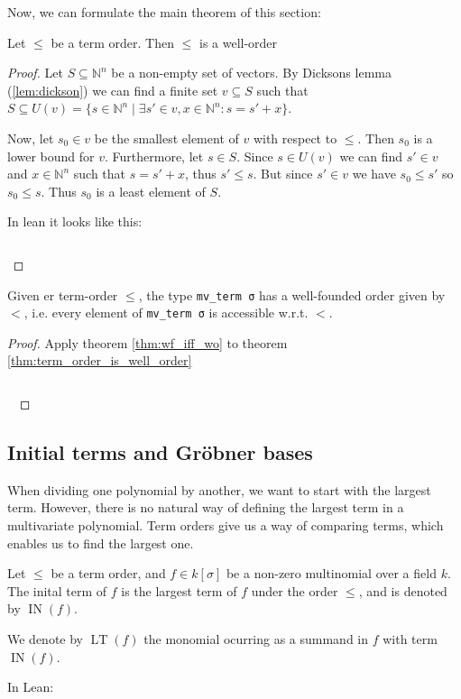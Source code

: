 \documentclass[a4paper, 12pt]{article}
\newcommand{\N}{\mathbb{N}}
\DeclareMathOperator{\IN}{IN}
\DeclareMathOperator{\LT}{LT}
\newcommand{\lean}[1]{\texttt{#1}}
\theoremstyle{changedot}
\theoremstyle{changedotbreak}
\theoremstyle{nonumberplain}
\newtheorem{proof}{Proof}
\begin{document}
Now, we can formulate the main theorem of this section:

\begin{theorem}\label{thm:term_order_is_well_order}
  Let $\le$ be a term order. Then $\le$ is a well-order
\end{theorem}
\begin{proof}
  Let $S \subseteq \N^{n}$ be a non-empty set of vectors. By Dicksons lemma (\ref{lem:dickson}) we can find a finite set $v \subseteq S$ such that $S \subseteq U(v) = \{s \in \N^{n} \mid \exists s' \in v, x \in \N^{n} : s = s' + x\}$.

  Now, let $s_{0} \in v$ be the smallest element of $v$ with respect to $\le$. Then $s_{0}$ is a lower bound for $v$. Furthermore, let $s \in S$. Since $s \in U(v)$ we can find $s' \in v$ and $x \in \N^{n}$ such that $s = s' + x$, thus $s' \le s$. But since $s' \in v$ we have $s_{0} \le s'$ so $s_{0} \le s$. Thus $s_{0}$ is a least element of $S$.

  In lean it looks like this:

  \inputminted[firstline=144, lastline=168]{lean}{../src/monomial_order.lean}
\end{proof}

\begin{corollary}
  Given er term-order $\le$, the type \lean{mv_term σ} has a well-founded order given by $<$, i.e. every element of \lean{mv_term σ} is accessible w.r.t. $<$.
\end{corollary}
\begin{proof}
  Apply theorem \ref{thm:wf_iff_wo} to theorem \ref{thm:term_order_is_well_order}

  \inputminted[firstline=170, lastline=177]{lean}{../src/monomial_order.lean}
  ~
\end{proof}



\subsection{Initial terms and Gröbner bases}

When dividing one polynomial by another, we want to start with the largest term. However, there is no natural way of defining the largest term in a multivariate polynomial. Term orders give us a way of comparing terms, which enables us to find the largest one.

\begin{definition}
  Let $\le$ be a term order, and $f \in k[\sigma]$ be a non-zero multinomial over a field $k$. The inital term of $f$ is the largest term of $f$ under the order $\le$, and is denoted by $\IN(f)$.

  We denote by $\LT(f)$ the monomial ocurring as a summand in $f$ with term $\IN(f)$.

  In Lean:
  \inputminted[firstline=69, lastline=75]{lean}{../src/monomial_order.lean}
\end{definition}
\end{document}
